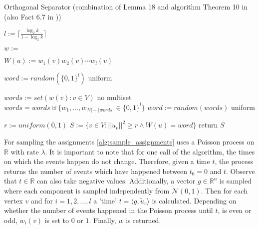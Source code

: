 \begin{algorithm}[htpb]
	\caption{Orthogonal Separator (combination of Lemma 18 and algorithm Theorem 10 in \cite{LouisM14} (also Fact 6.7 in \cite{ChanLTZ16})) \label{alg:orthogonal_separator}} 
\begin{algorithmic}
	\State $l := \lceil \frac{\log_2 k}{1-\log_2 k}\rceil$


	
	\State $w := $
	
	\State $W(u) := w_1(v)w_2(v)\cdots w_l(v)$
	\EndFor
	
	\State $word := random( \{0,1\}^l)$ \Comment uniform
	
	\Else
	 
	\State $words := set({w(v): v\in V})$ \Comment no multiset
	\State $words = words \uplus \{w_1, \ldots , w_{|V|-|words|} \in \{0,1\}^l\} $ 
	\State $word := random(words)$ \Comment uniform
	
	\EndIf
	
	\State $r := uniform(0,1)$
	\State $S := \{v \in V: ||u_v||^2 \ge r \land W(u) = word \}$
	\State return $S$
	
	\EndFunction %
\end{algorithmic}
\end{algorithm}	

For sampling the assignments \cref{alg:sample_assignments} uses a Poisson process on $\mathbb{R}$ with rate $\lambda$. It is important to note that for one call of the algorithm, the times on which the events happen do not change. Therefore, given a time $t$, the process returns the number of events which have happened between $t_0 = 0$ and $t$. Observe that $t\in \mathbb{R}$ can also take negative values.
Additionally, a vector $g \in \mathbb{R}^n$ is sampled where each component is sampled independently from $\mathcal{N}(0,1)$. Then for each vertex $v$ and for $i = 1, 2, \ldots, l$ a 'time' $t = \langle g, \tilde{u}_v \rangle $ is calculated. Depending on whether the number of events happened in the Poisson process until $t$, is even or odd, $w_i(v)$ is set to $0$ or $1$. Finally, $w$ is returned.
	
